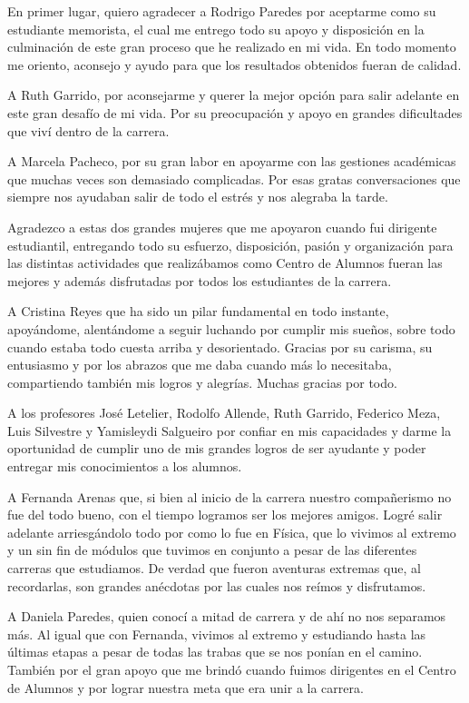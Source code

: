 
\begin{acknowledgment}
    En primer lugar, quiero agradecer a Rodrigo Paredes por aceptarme como su estudiante memorista, el cual me entrego todo su apoyo y disposición en la culminación de este gran proceso que he realizado en mi vida. En todo momento me oriento, aconsejo y ayudo para que los resultados obtenidos fueran de calidad.
    
    A Ruth Garrido, por aconsejarme y querer la mejor opción para salir adelante en este gran desafío de mi vida. Por su preocupación y apoyo en grandes dificultades que viví dentro de la carrera.
    
    A Marcela Pacheco, por su gran labor en apoyarme con las gestiones académicas que muchas veces son demasiado complicadas. Por esas gratas conversaciones que siempre nos ayudaban salir de todo el estrés y nos alegraba la tarde.
    
    Agradezco a estas dos grandes mujeres que me apoyaron cuando fui dirigente estudiantil, entregando todo su esfuerzo, disposición, pasión y organización para las distintas actividades que realizábamos como Centro de Alumnos fueran las mejores y además disfrutadas por todos los estudiantes de la carrera.
    
    A Cristina Reyes que ha sido un pilar fundamental en todo instante, apoyándome, alentándome a seguir luchando por cumplir mis sueños, sobre todo cuando estaba todo cuesta arriba y desorientado. Gracias por su carisma, su entusiasmo y por los abrazos que me daba cuando más lo necesitaba, compartiendo también mis logros y alegrías. Muchas gracias por todo.
    
    A los profesores José Letelier, Rodolfo Allende, Ruth Garrido, Federico Meza, Luis Silvestre y Yamisleydi Salgueiro por confiar en mis capacidades y darme la oportunidad de cumplir uno de mis grandes logros de ser ayudante y poder entregar mis conocimientos a los alumnos.

    A Fernanda Arenas que, si bien al inicio de la carrera nuestro compañerismo no fue del todo bueno, con el tiempo logramos ser los mejores amigos. Logré salir adelante arriesgándolo todo por como lo fue en Física, que lo vivimos al extremo y un sin fin de módulos que tuvimos en conjunto a pesar de las diferentes carreras que estudiamos. De verdad que fueron aventuras extremas que, al recordarlas, son grandes anécdotas por las cuales nos reímos y disfrutamos.
    
    A Daniela Paredes, quien conocí a mitad de carrera y de ahí no nos separamos más. Al igual que con Fernanda, vivimos al extremo y estudiando hasta las últimas etapas a pesar de todas las trabas que se nos ponían en el camino. También por el gran apoyo que me brindó cuando fuimos dirigentes en el Centro de Alumnos y por lograr nuestra meta que era unir a la carrera.
    

\end{acknowledgment}
